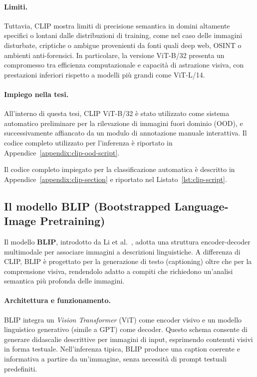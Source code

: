 \paragraph{Limiti.} Tuttavia, CLIP mostra limiti di precisione semantica in domini altamente specifici o lontani dalle distribuzioni di training, come nel caso delle immagini disturbate, criptiche o ambigue provenienti da fonti quali deep web, OSINT o ambienti anti-forensici. In particolare, la versione ViT-B/32 presenta un compromesso tra efficienza computazionale e capacità di astrazione visiva, con prestazioni inferiori rispetto a modelli più grandi come ViT-L/14.

\paragraph{Impiego nella tesi.} All’interno di questa tesi, CLIP ViT-B/32 è stato utilizzato come sistema automatico preliminare per la rilevazione di immagini fuori dominio (OOD), e successivamente affiancato da un modulo di annotazione manuale interattiva. Il codice completo utilizzato per l'inferenza è riportato in Appendice~\ref{appendix:clip-ood-script}.

Il codice completo impiegato per la classificazione automatica è descritto in Appendice~\ref{appendix:clip-section} e riportato nel Listato~\ref{lst:clip-script}.

\subsection*{Il modello BLIP (Bootstrapped Language-Image Pretraining)}
\label{sec:blip-model}

Il modello \textbf{BLIP}, introdotto da Li et al.~\cite{li2022blip}, adotta una struttura encoder-decoder multimodale per associare immagini a descrizioni linguistiche. A differenza di CLIP, BLIP è progettato per la generazione di testo (captioning) oltre che per la comprensione visiva, rendendolo adatto a compiti che richiedono un’analisi semantica più profonda delle immagini.

\paragraph{Architettura e funzionamento.} BLIP integra un \textit{Vision Transformer} (ViT) come encoder visivo e un modello linguistico generativo (simile a GPT) come decoder. Questo schema consente di generare didascalie descrittive per immagini di input, esprimendo contenuti visivi in forma testuale. Nell’inferenza tipica, BLIP produce una caption coerente e informativa a partire da un'immagine, senza necessità di prompt testuali predefiniti.

